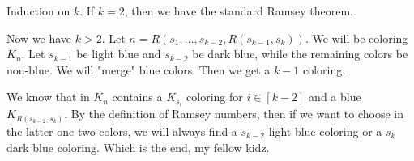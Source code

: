 \medskip

\medskip

Induction on $k$. If $k=2$, then we have the standard Ramsey theorem.
\medskip

Now we have $k>2$. Let $n=R(s_1,...,s_{k-2}, R(s_{k-1}, s_k))$. We will be coloring $K_n$. Let $s_{k-1}$ be light blue and $s_{k-2}$ be dark blue, while the remaining colors be non-blue. We will "merge" blue colors. Then we get a $k-1$ coloring.

We know that in $K_n$ contains a $K_{s_i}$ coloring for $i\in [k-2]$ and a blue $K_{R(s_{k-2}, s_k)}$.  By the definition of Ramsey numbers, then if we want to choose in the latter one two colors, we will always find a $s_{k-2}$ light blue coloring or a $s_k$ dark blue coloring. Which is the end, my fellow kidz.

